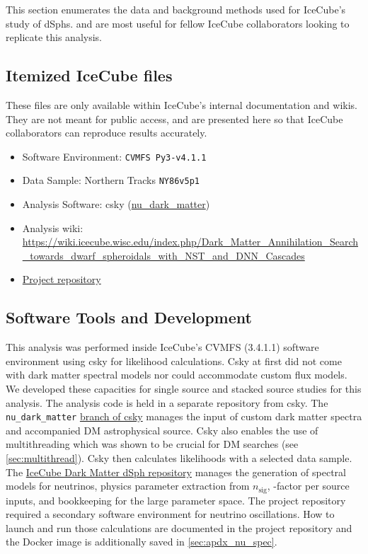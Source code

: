 This section enumerates the data and background methods used for IceCube's study of dSphs.
 and  are most useful for fellow IceCube collaborators looking to replicate this analysis.

\subsection{Itemized IceCube files}\label{sec:icDM_data}

These files are only available within IceCube's internal documentation and wikis.
They are not meant for public access, and are presented here so that IceCube collaborators can reproduce results accurately.

\begin{itemize}
    \item Software Environment: \texttt{CVMFS Py3-v4.1.1}
    \item Data Sample: Northern Tracks \texttt{NY86v5p1}
    \item Analysis Software: csky (\href{https://github.com/icecube/csky/tree/nu\_dark\_matter}{nu\_dark\_matter})
    \item Analysis wiki: \url{https://wiki.icecube.wisc.edu/index.php/Dark\_Matter\_Annihilation\_Search\_towards\_dwarf\_spheroidals\_with\_NST\_and\_DNN\_Cascades}
    \item \href{https://github.com/salaza82/IceCube_dark_matter_dsph}{Project repository}
\end{itemize}

\subsection{Software Tools and Development}\label{sec:icDM_tools}

This analysis was performed inside IceCube's CVMFS (3.4.1.1) software environment using csky for likelihood calculations.
Csky at first did not come with dark matter spectral models nor could accommodate custom flux models.
We developed these capacities for single source and stacked source studies for this analysis.
The analysis code is held in a separate repository from csky.
The \texttt{nu\_dark\_matter} \href{https://github.com/icecube/csky/tree/nu\_dark\_matter}{branch of csky} manages the input of custom dark matter spectra and accompanied DM astrophysical source.
Csky also enables the use of multithreading which was shown to be crucial for DM searches (see \cref{sec:multithread}).
Csky then calculates likelihoods with a selected data sample.
The \href{https://github.com/salaza82/IceCube_dark_matter_dsph}{IceCube Dark Matter dSph repository} manages the generation of spectral models for neutrinos, physics parameter extraction from $n_{\mathrm{sig}}$, \J-factor per source inputs, and bookkeeping for the large parameter space.
The project repository required a secondary software environment for neutrino oscillations.
How to launch and run those calculations are documented in the project repository and the Docker image is additionally saved in \cref{sec:apdx_nu_spec}.

